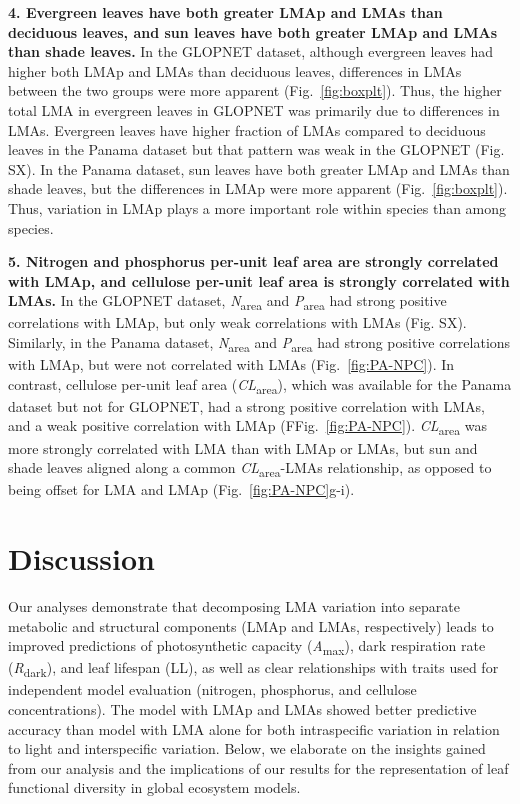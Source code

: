 \documentclass[
  12pt,
  a4paper,
,tablecaptionabove
]{scrartcl}
\begin{document}
\textbf{4. Evergreen leaves have both greater LMAp and LMAs than deciduous leaves, and sun leaves have both greater LMAp and LMAs than shade leaves.}
In the GLOPNET dataset, although evergreen leaves had higher both LMAp and LMAs than deciduous leaves, differences in LMAs between the two groups were more apparent (Fig.~\ref{fig:boxplt}).
Thus, the higher total LMA in evergreen leaves in GLOPNET was primarily due to differences in LMAs.
Evergreen leaves have higher fraction of LMAs compared to deciduous leaves in the Panama dataset but that pattern was weak in the GLOPNET (Fig. SX).
In the Panama dataset, sun leaves have both greater LMAp and LMAs than shade leaves, but the differences in LMAp were more apparent (Fig.~\ref{fig:boxplt}).
Thus, variation in LMAp plays a more important role within species than among species.

\textbf{5. Nitrogen and phosphorus per-unit leaf area are strongly correlated with LMAp, and cellulose per-unit leaf area is strongly correlated with LMAs.}
In the GLOPNET dataset, \emph{N}\textsubscript{area} and \emph{P}\textsubscript{area} had strong positive correlations with LMAp, but only weak correlations with LMAs (Fig. SX).
Similarly, in the Panama dataset, \emph{N}\textsubscript{area} and \emph{P}\textsubscript{area} had strong positive correlations with LMAp, but were not correlated with LMAs (Fig.~\ref{fig:PA-NPC}).
In contrast, cellulose per-unit leaf area (\emph{CL}\textsubscript{area}), which was available for the Panama dataset but not for GLOPNET, had a strong positive correlation with LMAs, and a weak positive correlation with LMAp (FFig.~\ref{fig:PA-NPC}).
\emph{CL}\textsubscript{area} was more strongly correlated with LMA than with LMAp or LMAs, but sun and shade leaves aligned along a common \emph{CL}\textsubscript{area}-LMAs relationship, as opposed to being offset for LMA and LMAp (Fig.~\ref{fig:PA-NPC}g-i).

\hypertarget{discussion}{%
\section{Discussion}\label{discussion}}

Our analyses demonstrate that decomposing LMA variation into separate metabolic and structural components (LMAp and LMAs, respectively) leads to improved predictions of photosynthetic capacity (\emph{A}\textsubscript{max}), dark respiration rate (\emph{R}\textsubscript{dark}), and leaf lifespan (LL), as well as clear relationships with traits used for independent model evaluation (nitrogen, phosphorus, and cellulose concentrations).
The model with LMAp and LMAs showed better predictive accuracy than model with LMA alone for both intraspecific variation in relation to light and interspecific variation.
Below, we elaborate on the insights gained from our analysis and the implications of our results for the representation of leaf functional diversity in global ecosystem models.
\end{document}
